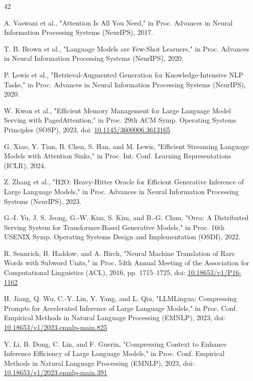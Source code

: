 \documentclass[pdflatex,sn-basic,Numbered]{sn-jnl}
\begin{document}
\begin{thebibliography}{42}

 A. Vaswani et al., "Attention Is All You Need," in Proc. Advances in Neural Information Processing Systems (NeurIPS), 2017.

 T. B. Brown et al., "Language Models are Few-Shot Learners," in Proc. Advances in Neural Information Processing Systems (NeurIPS), 2020.

 P. Lewis et al., "Retrieval-Augmented Generation for Knowledge-Intensive NLP Tasks," in Proc. Advances in Neural Information Processing Systems (NeurIPS), 2020.

 W. Kwon et al., "Efficient Memory Management for Large Language Model Serving with PagedAttention," in Proc. 29th ACM Symp. Operating Systems Principles (SOSP), 2023, doi: \href{https://doi.org/10.1145/3600006.3613165}{10.1145/3600006.3613165}

 G. Xiao, Y. Tian, B. Chen, S. Han, and M. Lewis, "Efficient Streaming Language Models with Attention Sinks," in Proc. Int. Conf. Learning Representations (ICLR), 2024.

 Z. Zhang et al., "H2O: Heavy-Hitter Oracle for Efficient Generative Inference of Large Language Models," in Proc. Advances in Neural Information Processing Systems (NeurIPS), 2023.

 G.-I. Yu, J. S. Jeong, G.-W. Kim, S. Kim, and B.-G. Chun, "Orca: A Distributed Serving System for Transformer-Based Generative Models," in Proc. 16th USENIX Symp. Operating Systems Design and Implementation (OSDI), 2022.

 R. Sennrich, B. Haddow, and A. Birch, "Neural Machine Translation of Rare Words with Subword Units," in Proc. 54th Annual Meeting of the Association for Computational Linguistics (ACL), 2016, pp. 1715--1725, doi: \href{https://doi.org/10.18653/v1/P16-1162}{10.18653/v1/P16-1162}

 H. Jiang, Q. Wu, C.-Y. Lin, Y. Yang, and L. Qiu, "LLMLingua: Compressing Prompts for Accelerated Inference of Large Language Models," in Proc. Conf. Empirical Methods in Natural Language Processing (EMNLP), 2023, doi: \href{https://doi.org/10.18653/v1/2023.emnlp-main.825}{10.18653/v1/2023.emnlp-main.825}

 Y. Li, B. Dong, C. Lin, and F. Guerin, "Compressing Context to Enhance Inference Efficiency of Large Language Models," in Proc. Conf. Empirical Methods in Natural Language Processing (EMNLP), 2023, doi: \href{https://doi.org/10.18653/v1/2023.emnlp-main.391}{10.18653/v1/2023.emnlp-main.391}


\end{thebibliography}
\end{document}
